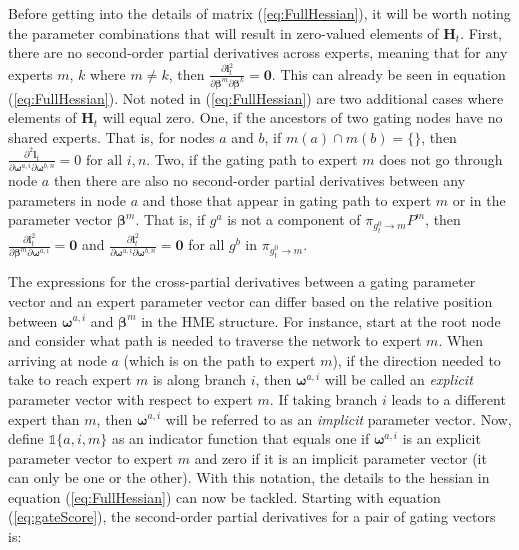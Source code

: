 \documentclass[12pt]{article}
\newcommand{\bw}[1]{\boldsymbol{\omega}^{#1}}
\newcommand{\gateprod}[2]{\pi_{#1 \longrightarrow #2}}
\begin{document}
Before getting into the details of matrix (\ref{eq:FullHessian}), it will
be worth noting the parameter combinations that will result in  zero-valued
elements of $\boldsymbol{H}_{t}$. First, there are no second-order
partial derivatives across experts, meaning that for any experts
$m$, $k$ where $m \neq k$, then
$\frac{\partial \boldsymbol{l}^{2}_{t}}{\partial \boldsymbol{\beta}^{m} \partial \boldsymbol{\beta}^k} = \boldsymbol{0}$.
This can already be seen in equation (\ref{eq:FullHessian}). Not noted in
(\ref{eq:FullHessian}) are two additional cases where elements of $\boldsymbol{H}_{t}$ will
equal zero. One, if the ancestors of two gating nodes have no shared experts. That is,
for nodes $a$ and $b$, if $m(a) \cap m(b) = \{\}$, then 
$ \frac{\partial^{2} \boldsymbol{l}_{t}}{\partial \boldsymbol{\omega}^{a, i} \partial \boldsymbol{\omega}^{b,n}} = 0 \,\, \textrm{for all} \,\, i, n$.
Two, if the gating path to expert $m$ does not go through node $a$ then
there are also no second-order partial derivatives between any parameters
in node $a$ and those that appear in gating path to expert $m$ or in the
parameter vector $\boldsymbol{\beta}^{m}$. That is, if $g^{a}$ is not a
component of $\gateprod{g^{0}_{t}}{m} P^{m}$, then
$\frac{\partial \boldsymbol{l}^{2}_{t}}{\partial \boldsymbol{\beta}^{m} \partial \bw{a, i}} = \boldsymbol{0}$
and $\frac{\partial \boldsymbol{l}^{2}_{t}}{\partial \bw{a, i} \partial \bw{b, n}} = \boldsymbol{0}$
for all $g^{b}$ in $\gateprod{g^{0}_{t}}{m}$.

\bigskip

The expressions for the cross-partial derivatives
between a gating parameter vector and an expert parameter vector can differ
based on the relative position between $\bw{a, i}$ and
$\boldsymbol{\beta}^{m}$ in the HME structure.
For instance, start at the root node and consider what path is needed to
traverse the network to expert $m$. When arriving at
node $a$ (which is on the path to expert $m$), if the direction needed to take to reach expert $m$ is along
branch $i$, then $\bw{a,i}$ will be called an \textit{explicit} parameter
vector with respect to expert $m$. If taking branch $i$ leads to a different expert
than $m$, then $\bw{a,i}$ will be referred to as an \textit{implicit}
parameter vector. Now, define $\mathbb{1}\{a, i, m\}$ as an indicator function
that equals one if $\bw{a, i}$ is an explicit parameter vector to expert $m$
and zero if it is an implicit parameter vector (it can only be one or the other).
With this notation, the details to the hessian in equation (\ref{eq:FullHessian})
can now be tackled. Starting with equation (\ref{eq:gateScore}), the
second-order partial derivatives for a pair of gating vectors is:
\end{document}
